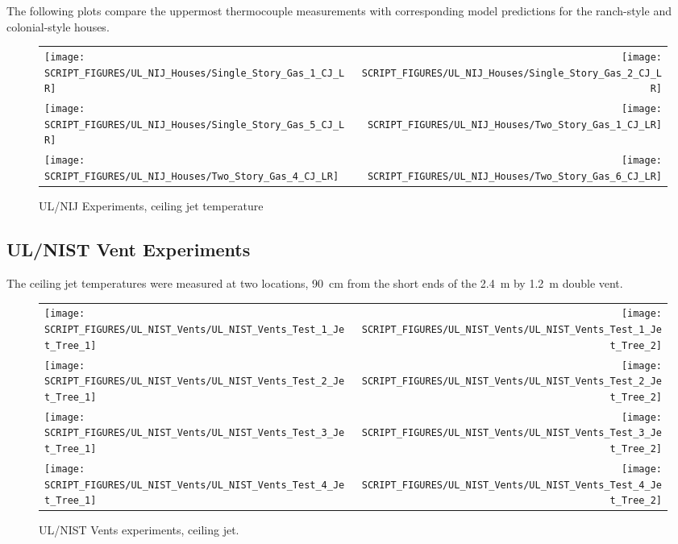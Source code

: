 The following plots compare the uppermost thermocouple measurements with corresponding model predictions for the ranch-style and colonial-style houses.


\begin{figure}[!h]
\begin{tabular*}{\textwidth}{l@{\extracolsep{\fill}}r}
\texttt{[image: SCRIPT\_FIGURES/UL\_NIJ\_Houses/Single\_Story\_Gas\_1\_CJ\_LR]} &
\texttt{[image: SCRIPT\_FIGURES/UL\_NIJ\_Houses/Single\_Story\_Gas\_2\_CJ\_LR]} \\
\texttt{[image: SCRIPT\_FIGURES/UL\_NIJ\_Houses/Single\_Story\_Gas\_5\_CJ\_LR]} &
\texttt{[image: SCRIPT\_FIGURES/UL\_NIJ\_Houses/Two\_Story\_Gas\_1\_CJ\_LR]} \\
\texttt{[image: SCRIPT\_FIGURES/UL\_NIJ\_Houses/Two\_Story\_Gas\_4\_CJ\_LR]} &
\texttt{[image: SCRIPT\_FIGURES/UL\_NIJ\_Houses/Two\_Story\_Gas\_6\_CJ\_LR]} \\
\end{tabular*}
\caption{UL/NIJ Experiments, ceiling jet temperature}
\label{UL_NIJ_CJ_1}
\end{figure}


\clearpage

\subsection{UL/NIST Vent Experiments}

The ceiling jet temperatures were measured at two locations, 90~cm from the short ends of the 2.4~m by 1.2~m double vent.

\newpage

\begin{figure}[p]
\begin{tabular*}{\textwidth}{l@{\extracolsep{\fill}}r}
\texttt{[image: SCRIPT\_FIGURES/UL\_NIST\_Vents/UL\_NIST\_Vents\_Test\_1\_Jet\_Tree\_1]} &
\texttt{[image: SCRIPT\_FIGURES/UL\_NIST\_Vents/UL\_NIST\_Vents\_Test\_1\_Jet\_Tree\_2]} \\
\texttt{[image: SCRIPT\_FIGURES/UL\_NIST\_Vents/UL\_NIST\_Vents\_Test\_2\_Jet\_Tree\_1]} &
\texttt{[image: SCRIPT\_FIGURES/UL\_NIST\_Vents/UL\_NIST\_Vents\_Test\_2\_Jet\_Tree\_2]} \\
\texttt{[image: SCRIPT\_FIGURES/UL\_NIST\_Vents/UL\_NIST\_Vents\_Test\_3\_Jet\_Tree\_1]} &
\texttt{[image: SCRIPT\_FIGURES/UL\_NIST\_Vents/UL\_NIST\_Vents\_Test\_3\_Jet\_Tree\_2]} \\
\texttt{[image: SCRIPT\_FIGURES/UL\_NIST\_Vents/UL\_NIST\_Vents\_Test\_4\_Jet\_Tree\_1]} &
\texttt{[image: SCRIPT\_FIGURES/UL\_NIST\_Vents/UL\_NIST\_Vents\_Test\_4\_Jet\_Tree\_2]}
\end{tabular*}
\caption[UL/NIST Vents experiments, ceiling jet]{UL/NIST Vents experiments, ceiling jet.}
\label{UL_NIST_Ceiling_Jet}
\end{figure}


